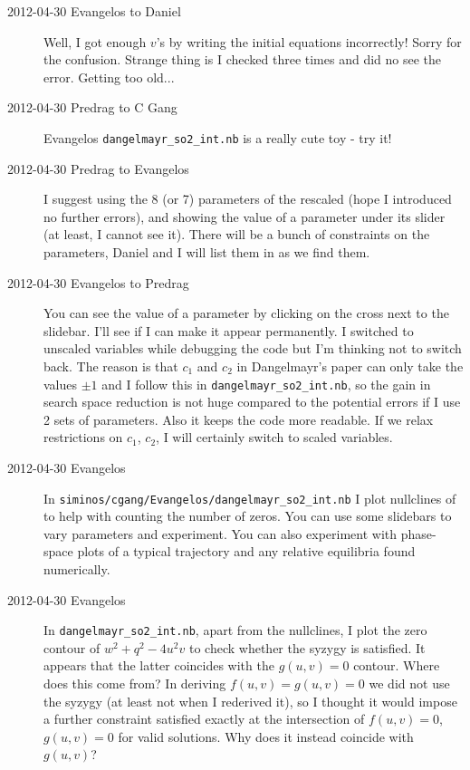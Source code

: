 \begin{description}
\item[2012-04-30 Evangelos to Daniel] Well, I got enough $v$'s by writing
the initial equations incorrectly! Sorry for the confusion. Strange thing is
I checked three times and did no see the error. Getting too old...

\item[2012-04-30 Predrag to C Gang] Evangelos
\texttt{dangelmayr\_so2\_int.nb} is a really cute toy - try it!

\item[2012-04-30 Predrag to Evangelos] I suggest using the 8 (or 7)
parameters of the rescaled  (hope I introduced no
further errors), and showing the value of a parameter under its slider
(at least, I cannot see it). There will be a bunch of constraints on the
parameters, Daniel and I will list them in as we find them.

\item[2012-04-30 Evangelos to Predrag] You can see the value of a parameter by
clicking on the cross next to the slidebar. I'll see if I can make it appear
permanently. I switched to unscaled variables while debugging the code but
I'm thinking not to switch back. The reason is that $c_1$ and $c_2$ in
Dangelmayr's paper can only take the values $\pm1$ and I follow this in
\texttt{dangelmayr\_so2\_int.nb}, so the gain in search space reduction is
not huge compared to the potential errors if I use 2 sets of parameters.
Also it keeps the code more readable. If we relax
restrictions on $c_1$, $c_2$, I will certainly switch to scaled variables.

\item[2012-04-30 Evangelos] In \texttt{siminos/cgang/Evangelos/dangelmayr\_so2\_int.nb}
I plot nullclines of  to help with counting the number of
zeros. You can use some slidebars to vary parameters and experiment. You can
also experiment with phase-space plots of a typical trajectory and any relative
equilibria found numerically.

\item[2012-04-30 Evangelos] In \texttt{dangelmayr\_so2\_int.nb}, apart from
the nullclines, I plot the zero contour of $w^2+q^2-4u^2v$ to check whether
the syzygy is satisfied. It appears that the latter coincides with the $g(u,v)=0$
contour. Where does this come from? In deriving $f(u,v)=g(u,v)=0$ we did not
use the syzygy (at least not when I rederived it), so I thought it would impose
a further constraint satisfied exactly at the intersection of $f(u,v)=0$,
$g(u,v)=0$ for valid solutions. Why does it instead coincide with $g(u,v)$?


\end{description}
